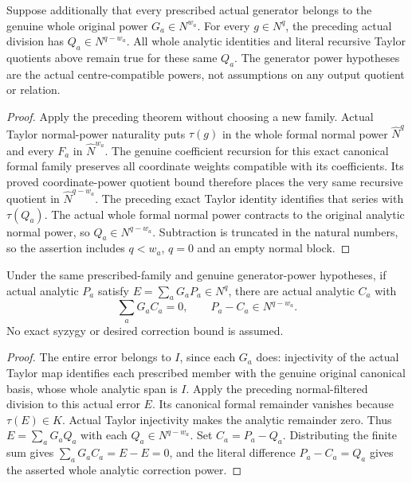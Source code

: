 \begin{theorem}
\label{hir:actual-prescribed-canonical-normal-filtered-division}
\leanok
Suppose additionally that every prescribed actual generator belongs to
the genuine whole original power $G_a\in N^{w_a}$. For every
$g\in N^q$, the preceding actual division has
$Q_a\in N^{q-w_a}$. All whole analytic identities and literal recursive
Taylor quotients above remain true for these same $Q_a$.
The generator power hypotheses are the actual centre-compatible powers,
not assumptions on any output quotient or relation.
\end{theorem}
\begin{proof}
Apply the preceding theorem without choosing a new family. Actual Taylor
normal-power naturality puts $\tau(g)$ in the whole formal normal power
$\widehat N^q$ and every $F_a$ in $\widehat N^{w_a}$. The genuine
coefficient recursion for this exact canonical formal family preserves
all coordinate weights compatible with its coefficients. Its proved
coordinate-power quotient bound therefore places the very same recursive
quotient in $\widehat N^{q-w_a}$. The preceding exact Taylor identity
identifies that series with $\tau(Q_a)$. The actual whole formal normal
power contracts to the original analytic normal power, so
$Q_a\in N^{q-w_a}$. Subtraction is truncated in the natural numbers,
so the assertion includes $q<w_a$, $q=0$ and an empty normal block.
\end{proof}

\begin{theorem}
\label{hir:actual-prescribed-canonical-normal-syzygy-correction}
\leanok
Under the same prescribed-family and genuine generator-power hypotheses,
if actual analytic $P_a$ satisfy $E=\sum_aG_aP_a\in N^q$, there are
actual analytic $C_a$ with
\[
 \sum_aG_aC_a=0,\qquad P_a-C_a\in N^{q-w_a}.
\]
No exact syzygy or desired correction bound is assumed.
\end{theorem}
\begin{proof}
The entire error belongs to $I$, since each $G_a$ does: injectivity of
the actual Taylor map identifies each prescribed member with the genuine
original canonical basis, whose whole analytic span is $I$.
Apply the preceding normal-filtered division to this actual error $E$.
Its canonical formal remainder vanishes because $\tau(E)\in K$.
Actual Taylor injectivity makes the analytic remainder zero. Thus
$E=\sum_aG_aQ_a$ with each $Q_a\in N^{q-w_a}$. Set
$C_a=P_a-Q_a$. Distributing the finite sum gives
$\sum_aG_aC_a=E-E=0$, and the literal difference
$P_a-C_a=Q_a$ gives the asserted whole analytic correction power.
\end{proof}

